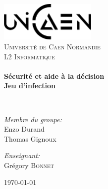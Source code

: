 \begin{titlepage}
\begin{center}

\includegraphics[width=0.35\textwidth]{./logo}~\\[1cm]

\textsc{\LARGE Université de Caen Normandie}\\[1.5cm]

\textsc{\Large L2 Informatique }\\[1.5cm]

\HRule \\[0.4cm]

{\huge \bfseries Sécurité et aide à la décision \\
 Jeu d’infection \\[0.4cm] }

\HRule \\[1.5cm]

\begin{minipage}{0.4\textwidth}
\begin{flushleft} \large
\emph{Membre du groupe:}\\
Enzo Durand\\
Thomas Gignoux\\


\end{flushleft}
\end{minipage}
\begin{minipage}{0.4\textwidth}
\begin{flushright} \large
\emph{Enseignant:} \\
Grégory \textsc{Bonnet}\\
\end{flushright}
\end{minipage}

\vfill

{\large \today}

\end{center}
\end{titlepage}